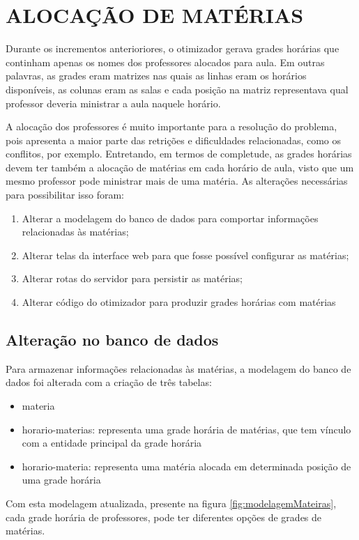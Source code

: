 \section{ALOCAÇÃO DE MATÉRIAS}

Durante os incrementos anterioriores, o otimizador gerava grades horárias que continham apenas os nomes dos professores alocados para aula. Em outras palavras, as grades eram matrizes nas quais as linhas eram os horários disponíveis, as colunas eram as salas e cada posição na matriz representava qual professor deveria ministrar a aula naquele horário.

A alocação dos professores é muito importante para a resolução do problema, pois apresenta a maior parte das retrições e dificuldades relacionadas, como os conflitos, por exemplo. Entretando, em termos de completude, as grades horárias devem ter também a alocação de matérias em cada horário de aula, visto que um mesmo professor pode ministrar mais de uma matéria. As alterações necessárias para possibilitar isso foram:

\begin{enumerate}
	\item Alterar a modelagem do banco de dados para comportar informações relacionadas às matérias;
	\item Alterar telas da interface web para que fosse possível configurar as matérias;
	\item Alterar rotas do servidor para persistir as matérias;
	\item Alterar código do otimizador para produzir grades horárias com matérias
\end{enumerate}

\subsection{Alteração no banco de dados}
Para armazenar informações relacionadas às matérias, a modelagem do banco de dados foi alterada com a criação de três tabelas: 
\begin{itemize}
	\item materia
	\item horario-materias: representa uma grade horária de matérias, que tem vínculo com a entidade principal da grade horária
	\item horario-materia: representa uma matéria alocada em determinada posição de uma grade horária
\end{itemize}

Com esta modelagem atualizada, presente na figura \ref{fig:modelagemMateiras}, cada grade horária de professores, pode ter diferentes opções de grades de matérias.

